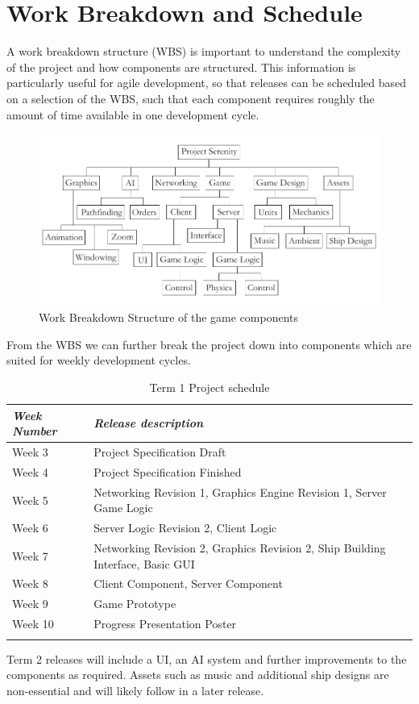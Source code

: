 \section{Work Breakdown and Schedule}
A work breakdown structure (WBS) is important to understand the complexity of the project and how components are structured. This information is particularly useful for agile development, so that releases can be scheduled based on a selection of the WBS,
 such that each component requires roughly the amount of time available in one development cycle.

\begin{figure}[h!]
	\includegraphics{res/wbs}
	\caption{Work Breakdown Structure of the game components}
\end{figure}

From the WBS we can further break the project down into components which are suited for weekly development cycles.

\begin{table}
	\begin{tabular}{l p{38em}}
		\toprule
		\emph{Week Number} & \emph{Release description} \\
		\midrule
		Week 3 & Project Specification Draft \\
		Week 4 & Project Specification Finished\\
		Week 5 & Networking Revision 1, Graphics Engine Revision 1, Server Game Logic\\
		Week 6 & Server Logic Revision 2, Client Logic\\
		Week 7 & Networking Revision 2, Graphics Revision 2, Ship Building Interface, Basic GUI\\
		Week 8 & Client Component, Server Component\\
		Week 9 & Game Prototype\\
		Week 10 & Progress Presentation Poster\\
		\bottomrule
		\caption{Term 1 Project schedule}
	\end{tabular}
	\label{tab:schedule}
\end{table}

Term 2 releases will include a UI, an AI system and further improvements to the components as required. Assets such as music and additional ship designs are non-essential and will likely follow in a later release.
